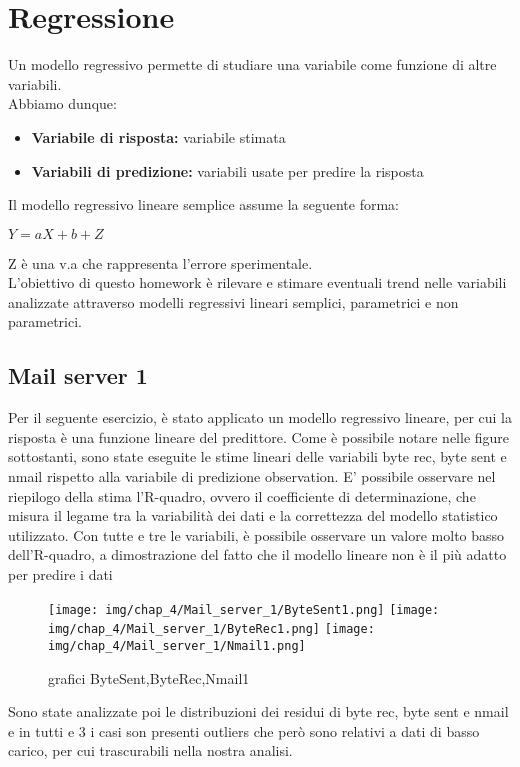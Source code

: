 \chapter{Regressione}
Un modello regressivo permette di studiare una variabile come funzione di altre variabili.\\
Abbiamo dunque:
\begin{itemize}
    \item \textbf{Variabile di risposta: } variabile stimata
    \item \textbf{Variabili di predizione:} variabili usate per predire la risposta
\end{itemize}
Il modello regressivo lineare semplice assume la seguente forma:
\begin{center}
    $
        Y = aX+b+Z
    $
\end{center}
Z è una v.a che rappresenta l’errore sperimentale.\\
L’obiettivo di questo homework è rilevare e stimare eventuali trend nelle variabili analizzate attraverso modelli regressivi lineari semplici, parametrici e non parametrici.
\section{Mail server 1}
Per il seguente esercizio, è stato applicato un modello regressivo lineare, per cui la risposta è una funzione lineare del predittore.
Come è possibile notare nelle figure sottostanti, sono state eseguite le stime lineari delle variabili byte rec, byte sent e nmail rispetto alla variabile di predizione observation.
E' possibile osservare nel riepilogo della stima l’R-quadro, ovvero il coefficiente di determinazione, che misura il legame tra la variabilità dei dati e la correttezza
del modello statistico utilizzato.
Con tutte e tre le variabili, è possibile osservare un valore molto basso dell'R-quadro, a dimostrazione del fatto che il modello lineare non è il più adatto per predire i dati
\begin{figure}[H]
    \centering
    \texttt{[image: img/chap\_4/Mail\_server\_1/ByteSent1.png]}
    \texttt{[image: img/chap\_4/Mail\_server\_1/ByteRec1.png]}
    \texttt{[image: img/chap\_4/Mail\_server\_1/Nmail1.png]}
    \caption{grafici ByteSent,ByteRec,Nmail1}
    \label{fig:sis_2_25_k}
\end{figure}
\noindent
Sono state analizzate poi le distribuzioni dei residui di byte
rec, byte sent e nmail e in tutti e 3 i casi son presenti outliers che però sono relativi a dati di basso carico, per cui trascurabili nella nostra analisi.

